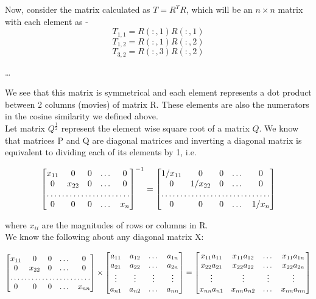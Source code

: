 \documentclass[11pt]{article}
\begin{document}
{Now, consider the matrix calculated as $T = R^TR$, which will be an $n \times n$ matrix with each element as -
$$T_{1,1} = R(:, 1) R(:, 1)$$
$$T_{1,2} = R(:, 1) R(:, 2)$$
$$T_{3,2} = R(:, 3) R(:, 2)$$
\begin{center} {\dots} \end{center}

We see that this matrix is symmetrical and each element represents a dot product between 2 columns (movies) of matrix R. These elements are also the numerators in the cosine similarity we defined above. \\

Let matrix $Q^{\frac{1}{2}}$ represent the element wise square root of a matrix $Q$. We know that matrices P and Q are diagonal matrices and inverting a diagonal matrix is equivalent to dividing each of its elements by 1, i.e.

\[
\begin{bmatrix}
    x_{11}   & 0 & 0 & \dots &0 \\
    0   & x_{22} & 0 & \dots & 0 \\
    \hdotsfor{5} \\
    0  & 0 & 0 & \dots & x_{n}
\end{bmatrix}^{-1}
=
\begin{bmatrix}
    1/x_{11}       & 0 & 0 & \dots &0 \\
    0  & 1/x_{22} & 0 & \dots & 0 \\
    \hdotsfor{5} \\
    0   & 0 & 0 & \dots & 1/x_{n}
\end{bmatrix}
\]

where $x_{ii}$ are the magnitudes of rows or columns in R. \\

We know the following about any diagonal matrix X:

\[
\begin{bmatrix}
    x_{11}   & 0 & 0 & \dots &0 \\
    0   & x_{22} & 0 & \dots & 0 \\
    \hdotsfor{5} \\
    0  & 0 & 0 & \dots & x_{nn}
\end{bmatrix} \times
\begin{bmatrix}
	a_{11} & a_{12} & \dots  & a_{1n} \\
    a_{21} & a_{22} & \dots  & a_{2n} \\
    \vdots & \vdots & \vdots & \vdots \\
    a_{n1} & a_{n2} & \dots  & a_{nn}
\end{bmatrix}
=
\begin{bmatrix}
	x_{11}a_{11} & x_{11}a_{12} &  \dots  & x_{11}a_{1n} \\
    x_{22}a_{21} & x_{22}a_{22} & \dots  & x_{22}a_{2n} \\
    \vdots & \vdots & \vdots & \vdots \\
    x_{nn}a_{n1} & x_{nn}a_{n2} & \dots  & x_{nn}a_{nn}
\end{bmatrix}
\]

}
\end{document}
